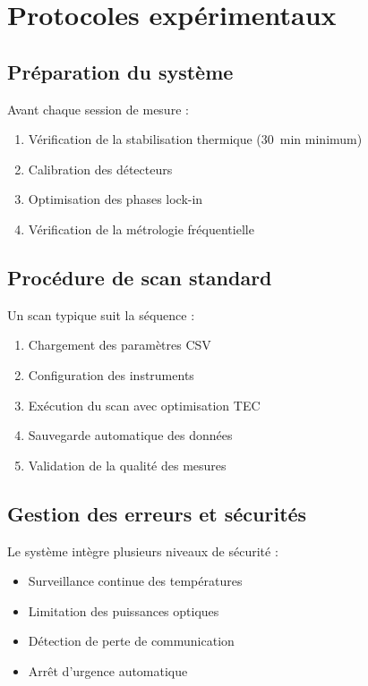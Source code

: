 \section{Protocoles expérimentaux}

\subsection{Préparation du système}

Avant chaque session de mesure :
\begin{enumerate}
    \item Vérification de la stabilisation thermique (\SI{30}{\minute} minimum)
    \item Calibration des détecteurs
    \item Optimisation des phases lock-in
    \item Vérification de la métrologie fréquentielle
\end{enumerate}

\subsection{Procédure de scan standard}

Un scan typique suit la séquence :
\begin{enumerate}
    \item Chargement des paramètres CSV
    \item Configuration des instruments
    \item Exécution du scan avec optimisation TEC
    \item Sauvegarde automatique des données
    \item Validation de la qualité des mesures
\end{enumerate}

\subsection{Gestion des erreurs et sécurités}

Le système intègre plusieurs niveaux de sécurité :
\begin{itemize}
    \item Surveillance continue des températures
    \item Limitation des puissances optiques
    \item Détection de perte de communication
    \item Arrêt d'urgence automatique
\end{itemize}

